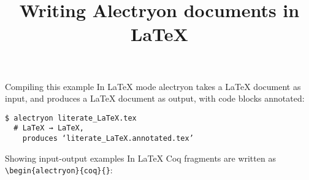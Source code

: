 \documentclass[10pt]{beamer}
\title{Writing Alectryon documents in LaTeX}
\begin{document}
\maketitle

\begin{frame}[fragile]{Compiling this example}
  In LaTeX mode alectryon takes a LaTeX document as input, and produces a LaTeX
  document as output, with code blocks annotated:

  \begin{verbatim}
$ alectryon literate_LaTeX.tex
  # LaTeX → LaTeX,
    produces ‘literate_LaTeX.annotated.tex’
  \end{verbatim}
\end{frame}

\begin{frame}[fragile]{Showing input-output examples}
  In LaTeX Coq fragments are written as \verb|\begin{alectryon}{coq}{}|:


\end{frame}
\end{document}
